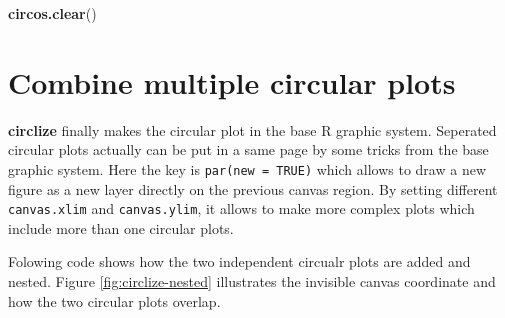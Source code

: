 \documentclass[]{book}
\newenvironment{Shaded}{\begin{snugshade}}{\end{snugshade}}
\newcommand{\KeywordTok}[1]{\textcolor[rgb]{0.13,0.29,0.53}{\textbf{#1}}}
\newcommand{\NormalTok}[1]{#1}
\begin{document}
\begin{Shaded}
\begin{Highlighting}[]
\KeywordTok{circos.clear}\NormalTok{()}
\end{Highlighting}
\end{Shaded}

\section{Combine multiple circular plots}\label{combine-circular-plots}

\textbf{circlize} finally makes the circular plot in the base R graphic
system. Seperated circular plots actually can be put in a same page by
some tricks from the base graphic system. Here the key is
\texttt{par(new\ =\ TRUE)} which allows to draw a new figure as a new
layer directly on the previous canvas region. By setting different
\texttt{canvas.xlim} and \texttt{canvas.ylim}, it allows to make more
complex plots which include more than one circular plots.

Folowing code shows how the two independent circualr plots are added and
nested. Figure \ref{fig:circlize-nested} illustrates the invisible
canvas coordinate and how the two circular plots overlap.
\end{document}

